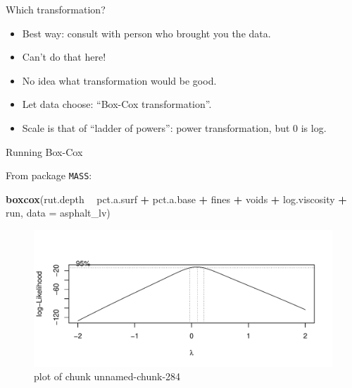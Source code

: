 \documentclass[
  ignorenonframetext,
]{beamer}
\newenvironment{Shaded}{\begin{snugshade}}{\end{snugshade}}
\newcommand{\DataTypeTok}[1]{\textcolor[rgb]{0.13,0.29,0.53}{#1}}
\newcommand{\KeywordTok}[1]{\textcolor[rgb]{0.13,0.29,0.53}{\textbf{#1}}}
\newcommand{\NormalTok}[1]{#1}
\newcommand{\OperatorTok}[1]{\textcolor[rgb]{0.81,0.36,0.00}{\textbf{#1}}}
\newcommand{\StringTok}[1]{\textcolor[rgb]{0.31,0.60,0.02}{#1}}
\providecommand{\tightlist}{%
  \setlength{\itemsep}{0pt}\setlength{\parskip}{0pt}}
\begin{document}
\begin{frame}{Which transformation?}
\protect\hypertarget{which-transformation}{}

\begin{itemize}
\tightlist
\item
  Best way: consult with person who brought you the data.
\item
  Can't do that here!
\item
  No idea what transformation would be good.
\item
  Let data choose: ``Box-Cox transformation''.
\item
  Scale is that of ``ladder of powers'': power transformation, but 0 is
  log.
\end{itemize}

\end{frame}

\begin{frame}[fragile]{Running Box-Cox}
\protect\hypertarget{running-box-cox}{}

From package \texttt{MASS}:

\begin{Shaded}
\begin{Highlighting}[]
\KeywordTok{boxcox}\NormalTok{(rut.depth }\OperatorTok{~}\StringTok{ }\NormalTok{pct.a.surf }\OperatorTok{+}\StringTok{ }\NormalTok{pct.a.base }\OperatorTok{+}\StringTok{ }\NormalTok{fines }\OperatorTok{+}\StringTok{ }\NormalTok{voids }\OperatorTok{+}
\StringTok{  }\NormalTok{log.viscosity }\OperatorTok{+}\StringTok{ }\NormalTok{run, }\DataTypeTok{data =}\NormalTok{ asphalt_lv)}
\end{Highlighting}
\end{Shaded}

\begin{figure}
\centering
\includegraphics{figure/unnamed-chunk-284-1.pdf}
\caption{plot of chunk unnamed-chunk-284}
\end{figure}

\end{frame}
\end{document}
